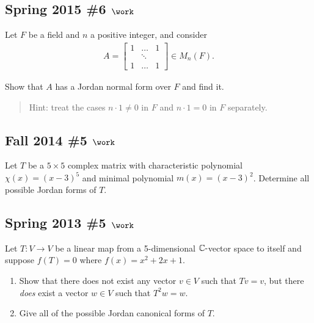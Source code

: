 \hypertarget{spring-2015-6-work}{%
\subsection{\texorpdfstring{Spring 2015 \#6
\(\work\)}{Spring 2015 \#6 \textbackslash work}}\label{spring-2015-6-work}}

Let \(F\) be a field and \(n\) a positive integer, and consider
\begin{align*}
A=\left[\begin{array}{ccc}
1 & \dots & 1 \\
& \ddots & \\
1 & \dots & 1
\end{array}\right] \in M_{n}(F)
.\end{align*}

Show that \(A\) has a Jordan normal form over \(F\) and find it.

\begin{quote}
Hint: treat the cases \(n\cdot 1 \neq 0\) in \(F\) and \(n\cdot 1 = 0\)
in \(F\) separately.
\end{quote}

\hypertarget{fall-2014-5-work}{%
\subsection{\texorpdfstring{Fall 2014 \#5
\(\work\)}{Fall 2014 \#5 \textbackslash work}}\label{fall-2014-5-work}}

Let \(T\) be a \(5\times 5\) complex matrix with characteristic
polynomial \(\chi(x) = (x-3)^5\) and minimal polynomial
\(m(x) = (x-3)^2\). Determine all possible Jordan forms of \(T\).

\hypertarget{spring-2013-5-work}{%
\subsection{\texorpdfstring{Spring 2013 \#5
\(\work\)}{Spring 2013 \#5 \textbackslash work}}\label{spring-2013-5-work}}

Let \(T: V\to V\) be a linear map from a 5-dimensional
\({\mathbb{C}}{\hbox{-}}\)vector space to itself and suppose
\(f(T) = 0\) where \(f(x) = x^2 + 2x + 1\).

\begin{enumerate}
\def\labelenumi{\alph{enumi}.}
\item
  Show that there does not exist any vector \(v\in V\) such that
  \(Tv = v\), but there \emph{does} exist a vector \(w\in V\) such that
  \(T^2 w= w\).
\item
  Give all of the possible Jordan canonical forms of \(T\).
\end{enumerate}

